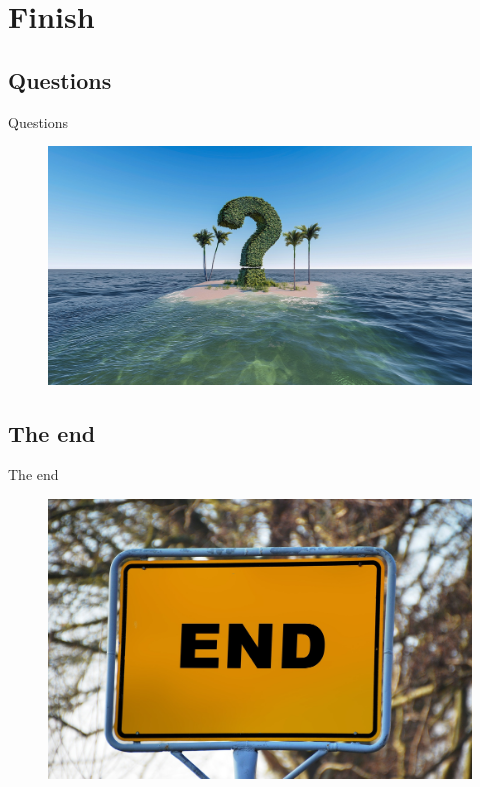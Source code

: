 \section{Finish}

\subsection{Questions}

\begin{frame}{Questions}
  \begin{figure}[!ht]
     \centering
     \includegraphics[width=0.9\linewidth]{img/question-mark-3255140_1920.jpg}
  \end{figure}
\end{frame}

\subsection{The end}

\begin{frame}{The end}
  \begin{figure}[!ht]
     \centering
     \includegraphics[width=0.8\linewidth]{img/town-sign-1158385_1920.jpg}
  \end{figure}
\end{frame}



